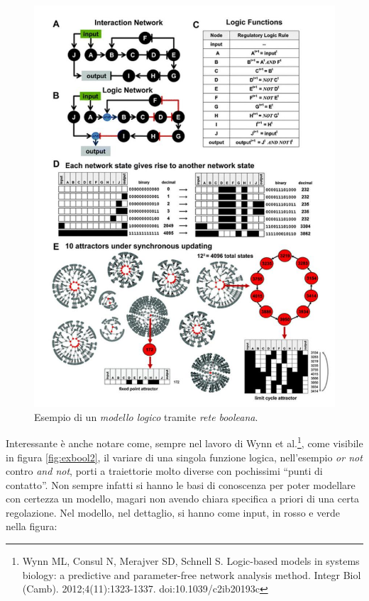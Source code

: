 \documentclass[a4paper,12pt, oneside]{book}
\begin{document}
\begin{figure}
  \centering
  \includegraphics[scale = 0.35]{img/exbool.jpg}
  \caption{Esempio di un \textit{modello logico} tramite \textit{rete
      booleana}.} 
  \label{fig:exbool}
\end{figure}
Interessante è anche notare come, sempre nel lavoro di Wynn et al.\footnote{Wynn
  ML, Consul N, Merajver SD, Schnell S. Logic-based models in 
  systems biology: a predictive and parameter-free network analysis
  method. Integr Biol
  (Camb). 2012;4(11):1323-1337. doi:10.1039/c2ib20193c}, come visibile in figura
\ref{fig:exbool2}, il variare di una singola funzione logica, nell'esempio
\textit{or not} contro \textit{and not}, porti a traiettorie molto diverse con
pochissimi ``punti di contatto''. Non sempre infatti si hanno le basi di
conoscenza per poter modellare con certezza un modello, magari non avendo chiara
specifica a priori di una certa regolazione. Nel modello, nel dettaglio, si
hanno come input, in rosso e verde nella figura:
\end{document}
